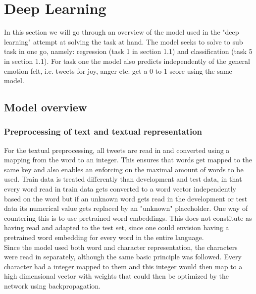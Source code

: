 
\section{Deep Learning}
In this section we will go through an overview of the model used in the "deep learning" attempt at solving the task at hand. The model seeks to solve to sub task in one go, namely: regression (task 1 in section 1.1) and classification (task 5 in section 1.1). For task one the model also predicts independently of the general emotion felt, i.e. tweets for joy, anger etc. get a 0-to-1 score using the same model.

\subsection{Model overview}

\subsubsection*{Preprocessing of text and textual representation} \label{sec:preprop}
For the textual preprocessing, all tweets are read in and converted using a mapping from the word to an integer. This ensures that words get mapped to the same key and also enables an enforcing on the maximal amount of words to be used. Train data is treated differently than development and test data, in that every word read in train data gets converted to a word vector independently based on the word but if an unknown word gets read in the development or test data its numerical value gets replaced by an "unknown" placeholder. One way of countering this is to use pretrained word embeddings. This does not constitute as having read and adapted to the test set, since one could envision having a pretrained word embedding for every word in the entire language.\\
Since the model used both word and character representation, the characters were read in separately, although the same basic principle was followed. Every character had a integer mapped to them and this integer would then map to a high dimensional vector with weights that could then be optimized by the network using backpropagation. 

